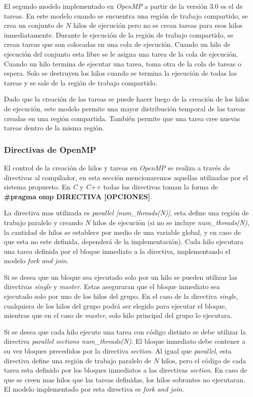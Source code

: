 El segundo modelo implementado en \emph{OpenMP} a partir de la versión $3.0$ es
el de tareas. En este modelo cuando se encuentra una región de trabajo
compartido, se crea un conjunto de $N$ hilos de ejecución pero no se crean
tareas para esos hilos inmediatamente. Durante le ejecución de la región de
trabajo compartido, se crean tareas que son colocadas en una cola de ejecución.
Cuando un hilo de ejecución del conjunto esta libre se le asigna una tarea de la
cola de ejecución. Cuando un hilo termina de ejecutar una tarea, toma otra de la
cola de tareas o espera. Solo se destruyen los hilos cuando se termina la
ejecución de todas las tareas y se sale de la región de trabajo compartido.

Dado que la creación de las tareas se puede hacer luego de la creación de los
hilos de ejecución, este modelo permite una mayor distribución temporal de las
tareas creadas en una región compartida. También permite que una tarea cree
nuevas tareas dentro de la misma región.

\subsubsection{Directivas de OpenMP}

El control de la creación de hilos y tareas en \emph{OpenMP} se realiza a través
de directivas al compilador, en esta sección mencionaremos aquellas utilizadas
por el sistema propuesto. En \emph{C} y \emph{C++} todas las directivas toman la
forma de \textbf{\#pragma omp DIRECTIVA [OPCIONES]}.

La directiva mas utilizada es \emph{parallel [num\_threads(N)]}, esta define una
región de trabajo paralelo y creando $N$ hilos de ejecución (si no se incluye
\emph{num\_threads(N)}, la cantidad de hilos se establece por medio de una
variable global, y en caso de que esta no este definida, dependerá de la
implementación). Cada hilo ejecutara una tarea definida por el bloque inmediato
a la directiva, implementando el modelo \emph{fork and join}.

Si se desea que un bloque sea ejecutado solo por un hilo se pueden utilizar las
directivas \emph{single} y \emph{master}. Estas aseguraran que el bloque
inmediato sea ejecutado solo por uno de los hilos del grupo. En el caso de la
directiva \emph{single}, cualquiera de los hilos del grupo podrá ser elegido
para ejecutar el bloque, mientras que en el caso de \emph{master}, solo hilo
principal del grupo lo ejecutara.

Si se desea que cada hilo ejecute una tarea con código distinto se debe utilizar
la directiva \emph{parallel sections num\_threads(N)}. El bloque inmediato debe
contener a su vez bloques precedidos por la directiva \emph{section}. Al igual
que \emph{parallel}, esta directiva define una región de trabajo paralelo de $N$
hilos, pero el código de cada tarea esta definido por los bloques inmediatos a
las directivas \emph{section}. En caso de que se creen mas hilos que las tareas
definidas, los hilos sobrantes no ejecutaran. El modelo implementado por esta
directiva es \emph{fork and join}.

